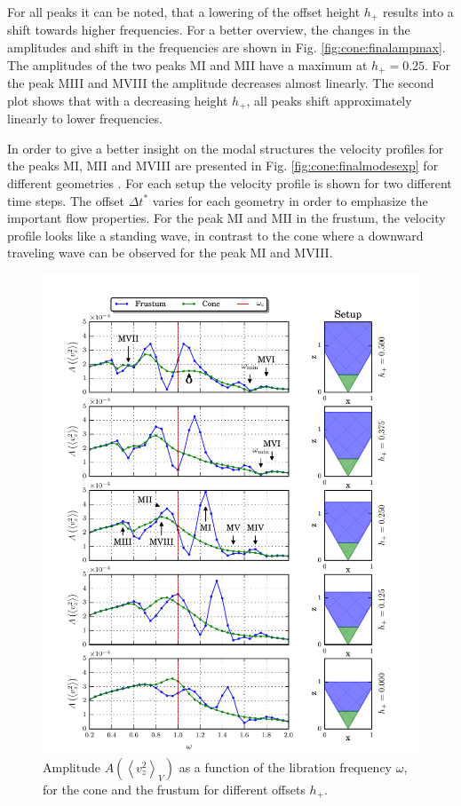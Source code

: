 For all peaks  it can be noted, that a lowering of the offset height $h_+$ results
into a shift towards higher frequencies. %
For a better overview, the changes in the amplitudes and shift in the frequencies are shown in
Fig. \ref{fig:cone:finalampmax}. %
The amplitudes of the two peaks M\RN{1} and M\RN{2} have a maximum at $h_+= 0.25$. For the peak M\RN{3} and M\RN{8} the amplitude decreases almost linearly.
The second plot shows that with a decreasing height $h_+$,
all peaks shift approximately linearly to lower frequencies.

In order to give a better insight on the modal structures the velocity profiles for the peaks M\RN{1}, M\RN{2} and M\RN{8}
are presented in Fig. \ref{fig:cone:finalmodesexp} for different geometries .
For each setup the velocity profile is shown for two different time steps. The offset $\Delta t^*$  varies for each geometry in order to emphasize
the important flow properties.
For the peak M\RN{1} and M\RN{2} in the frustum, the velocity profile looks like a standing wave,
in contrast to the cone where a downward traveling wave can be observed for the peak M\RN{1} and M\RN{8}.


\begin{figure}[!pt]
  \centering
  \includegraphics{gfx/cone/final/transition.pdf}
  \caption{
      \label{fig:cone:finaltransition}Amplitude $A\left(\left<v^2_z\right>_V\right)$ as a function of the libration frequency $\omega$,
      for the cone  and the frustum for different offsets $h_+$.
    }
\end{figure}
\clearpage

